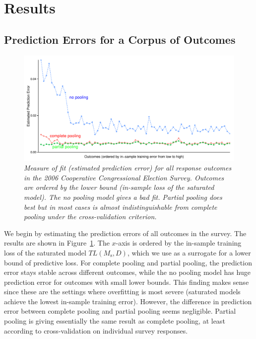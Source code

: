 \documentclass[sii]{ipart}
\begin{document}
\section{Results}

\subsection{Prediction Errors for a Corpus of Outcomes}


\begin{figure}
  \centering
  \includegraphics[width=.85\textwidth]{alloutcomesx1.pdf}
  \caption{\em Measure of fit (estimated prediction error) for all response outcomes
    in the 2006 Cooperative Congressional Election Survey. Outcomes are ordered by the lower bound
    (in-sample loss of the saturated model). The no pooling model
    gives a bad fit.  Partial pooling does best but in most cases is almost indistinguishable from complete pooling under the cross-validation criterion.}
  \label{fig:figx1}
\end{figure}

We begin by estimating the prediction errors of all outcomes in the survey. The
results are shown in Figure~\ref{fig:figx1}. The $x$-axis is ordered by the
in-sample training loss of the saturated model $TL(M_{\text{s}},D)$, which we use
as a surrogate for a lower bound of predictive
loss. %
For complete pooling and partial pooling, the prediction error stays stable
across different outcomes, while the no pooling model has huge prediction error
for outcomes with small lower bounds. This finding makes sense since these are
the settings where overfitting is most severe (saturated models achieve the lowest
in-sample training error). However, the difference in prediction error between
complete pooling and partial pooling seems negligible. Partial pooling is giving
essentially the same result as complete pooling, at least according to
cross-validation on individual survey responses.
\end{document}
